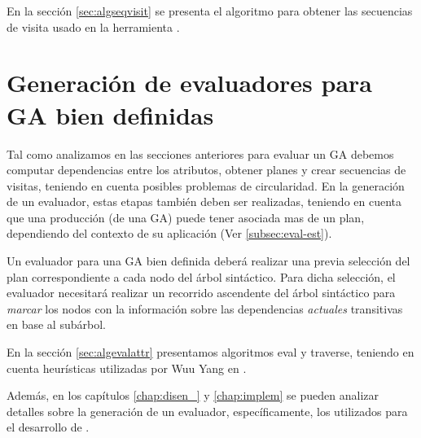 En la sección \ref{sec:algseqvisit} se presenta el algoritmo para obtener las secuencias de visita usado en la herramienta \maggen.

\section{Generación de evaluadores para GA bien definidas}

Tal como analizamos en las secciones anteriores para evaluar un GA debemos computar dependencias entre los atributos, obtener planes y crear secuencias de visitas, teniendo en cuenta posibles problemas de circularidad. En la generación de un evaluador, estas etapas también deben ser realizadas, teniendo en cuenta que una producción (de una GA) puede tener asociada mas de un plan, dependiendo del contexto de su aplicación (Ver \ref{subsec:eval-est}). 

Un evaluador para una GA bien definida deberá realizar una previa selección del plan correspondiente a cada nodo del árbol sintáctico. Para dicha selección, el evaluador necesitará realizar un recorrido ascendente del árbol sintáctico para \emph{marcar} los nodos con la información sobre las dependencias \emph{actuales} transitivas en base al subárbol.

En la sección \ref{sec:algevalattr} presentamos algoritmos eval y traverse, teniendo en cuenta heurísticas utilizadas por Wuu Yang en \cite{wuu-yang1}.

Además, en los capítulos \ref{chap:disen_} y \ref{chap:implem} se pueden analizar detalles sobre la generación de un evaluador, específicamente, los utilizados para el desarrollo de \maggen.
